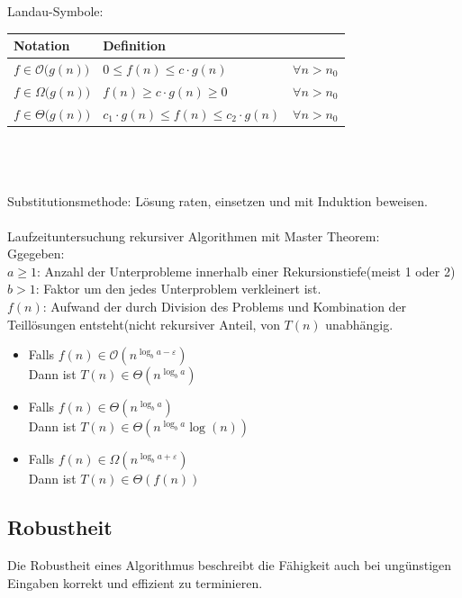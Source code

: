 \documentclass[10pt,a4paper]{scrartcl}
\begin{document}
Landau-Symbole:\\
\begin{tabular}{l|ll}
	Notation & Definition\\ \hline
	$f \in \mathcal O \bigl(g(n)\bigr)$ & $0 \le f(n) \le c \cdot g(n)$ & $\forall n > n_0$\\
	$f \in \Omega \bigl(g(n)\bigr)$ & $f(n) \ge c \cdot g(n) \ge 0$ & $\forall n > n_0$\\
	$f \in \Theta \bigl( g(n) \bigr)$ &  $c_1 \cdot g(n) \le f(n) \le c_2 \cdot g(n)$ & $\forall n > n_0$\\
\end{tabular}\\
\\ \\
Substitutionsmethode: Lösung raten, einsetzen und mit Induktion beweisen.\\
\\
Laufzeituntersuchung rekursiver Algorithmen mit Master Theorem:\\
Ggegeben: \\ 
$a\ge1$: Anzahl der Unterprobleme innerhalb einer Rekursionstiefe(meist 1 oder 2) \\
$b>1$: Faktor um den jedes Unterproblem verkleinert ist.\\
$f(n)$: Aufwand der durch Division des Problems und Kombination der Teillösungen entsteht(nicht rekursiver Anteil, von $T(n)$ unabhängig.\\
\begin{itemize}
	\item Falls $f(n) \in \mathcal{O}\left( n^{\log_b a - \varepsilon} \right)$\\
		Dann ist $T(n) \in \Theta\left( n^{\log_b a} \right)$
	\item Falls $f(n) \in \Theta\left( n^{\log_b a} \right)$\\
		Dann ist $T(n) \in \Theta\left( n^{\log_b a} \log(n)\right)$
	\item Falls $f(n) \in \Omega\left( n^{\log_b a + \varepsilon} \right)$\\
		Dann ist $T(n) \in \Theta(f(n))$ 
\end{itemize}



	\subsection{Robustheit}
	Die Robustheit eines Algorithmus beschreibt die Fähigkeit auch bei ungünstigen Eingaben korrekt und effizient zu terminieren. 
\end{document}
